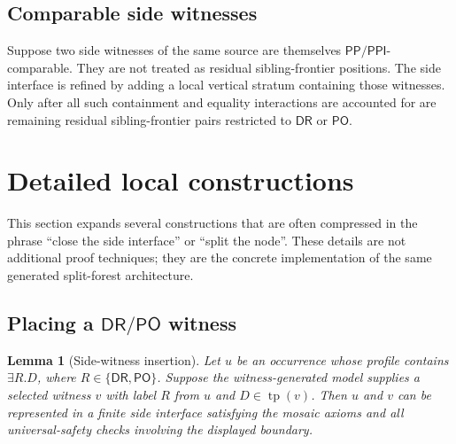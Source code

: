 \documentclass[11pt]{article}
\newtheorem{lemma}[theorem]{Lemma}
\newcommand{\DR}{\mathsf{DR}}
\newcommand{\PO}{\mathsf{PO}}
\newcommand{\PP}{\mathsf{PP}}
\newcommand{\PPI}{\mathsf{PPI}}
\newcommand{\typ}{\operatorname{tp}}
\begin{document}
\subsection{Comparable side witnesses}

Suppose two side witnesses of the same source are themselves $\PP/\PPI$-comparable.  They are not treated as residual sibling-frontier positions.  The side interface is refined by adding a local vertical stratum containing those witnesses.  Only after all such containment and equality interactions are accounted for are remaining residual sibling-frontier pairs restricted to $\DR$ or $\PO$.


\section{Detailed local constructions}
\label{sec:detailed-local}

This section expands several constructions that are often compressed in the phrase ``close the side interface'' or ``split the node''.  These details are not additional proof techniques; they are the concrete implementation of the same generated split-forest architecture.

\subsection{Placing a \texorpdfstring{$\DR/\PO$}{DR/PO} witness}

\begin{lemma}[Side-witness insertion]\label{lem:side-witness-insertion}
Let $u$ be an occurrence whose profile contains $\exists R.D$, where $R\in\{\DR,\PO\}$.  Suppose the witness-generated model supplies a selected witness $v$ with label $R$ from $u$ and $D\in\typ(v)$.  Then $u$ and $v$ can be represented in a finite side interface satisfying the mosaic axioms and all universal-safety checks involving the displayed boundary.
\end{lemma}
\end{document}
